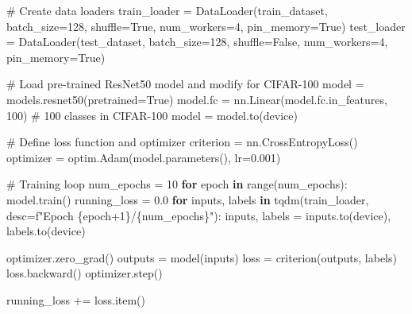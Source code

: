 \documentclass[
  letterpaper,
  DIV=11,
  numbers=noendperiod]{scrreprt}
\newenvironment{Shaded}{\begin{snugshade}}{\end{snugshade}}
\newcommand{\BuiltInTok}[1]{\textcolor[rgb]{0.00,0.23,0.31}{#1}}
\newcommand{\CommentTok}[1]{\textcolor[rgb]{0.37,0.37,0.37}{#1}}
\newcommand{\ControlFlowTok}[1]{\textcolor[rgb]{0.00,0.23,0.31}{\textbf{#1}}}
\newcommand{\DecValTok}[1]{\textcolor[rgb]{0.68,0.00,0.00}{#1}}
\newcommand{\FloatTok}[1]{\textcolor[rgb]{0.68,0.00,0.00}{#1}}
\newcommand{\KeywordTok}[1]{\textcolor[rgb]{0.00,0.23,0.31}{\textbf{#1}}}
\newcommand{\NormalTok}[1]{\textcolor[rgb]{0.00,0.23,0.31}{#1}}
\newcommand{\OperatorTok}[1]{\textcolor[rgb]{0.37,0.37,0.37}{#1}}
\newcommand{\SpecialCharTok}[1]{\textcolor[rgb]{0.37,0.37,0.37}{#1}}
\newcommand{\SpecialStringTok}[1]{\textcolor[rgb]{0.13,0.47,0.30}{#1}}
\newcommand{\VariableTok}[1]{\textcolor[rgb]{0.07,0.07,0.07}{#1}}
\begin{document}
\begin{Shaded}
\begin{Highlighting}[]
\CommentTok{\# Create data loaders}
\NormalTok{train\_loader }\OperatorTok{=}\NormalTok{ DataLoader(train\_dataset, batch\_size}\OperatorTok{=}\DecValTok{128}\NormalTok{, shuffle}\OperatorTok{=}\VariableTok{True}\NormalTok{, num\_workers}\OperatorTok{=}\DecValTok{4}\NormalTok{, pin\_memory}\OperatorTok{=}\VariableTok{True}\NormalTok{)}
\NormalTok{test\_loader }\OperatorTok{=}\NormalTok{ DataLoader(test\_dataset, batch\_size}\OperatorTok{=}\DecValTok{128}\NormalTok{, shuffle}\OperatorTok{=}\VariableTok{False}\NormalTok{, num\_workers}\OperatorTok{=}\DecValTok{4}\NormalTok{, pin\_memory}\OperatorTok{=}\VariableTok{True}\NormalTok{)}

\CommentTok{\# Load pre{-}trained ResNet50 model and modify for CIFAR{-}100}
\NormalTok{model }\OperatorTok{=}\NormalTok{ models.resnet50(pretrained}\OperatorTok{=}\VariableTok{True}\NormalTok{)}
\NormalTok{model.fc }\OperatorTok{=}\NormalTok{ nn.Linear(model.fc.in\_features, }\DecValTok{100}\NormalTok{)  }\CommentTok{\# 100 classes in CIFAR{-}100}
\NormalTok{model }\OperatorTok{=}\NormalTok{ model.to(device)}

\CommentTok{\# Define loss function and optimizer}
\NormalTok{criterion }\OperatorTok{=}\NormalTok{ nn.CrossEntropyLoss()}
\NormalTok{optimizer }\OperatorTok{=}\NormalTok{ optim.Adam(model.parameters(), lr}\OperatorTok{=}\FloatTok{0.001}\NormalTok{)}

\CommentTok{\# Training loop}
\NormalTok{num\_epochs }\OperatorTok{=} \DecValTok{10}
\ControlFlowTok{for}\NormalTok{ epoch }\KeywordTok{in} \BuiltInTok{range}\NormalTok{(num\_epochs):}
\NormalTok{    model.train()}
\NormalTok{    running\_loss }\OperatorTok{=} \FloatTok{0.0}
    \ControlFlowTok{for}\NormalTok{ inputs, labels }\KeywordTok{in}\NormalTok{ tqdm(train\_loader, desc}\OperatorTok{=}\SpecialStringTok{f"Epoch }\SpecialCharTok{\{}\NormalTok{epoch}\OperatorTok{+}\DecValTok{1}\SpecialCharTok{\}}\SpecialStringTok{/}\SpecialCharTok{\{}\NormalTok{num\_epochs}\SpecialCharTok{\}}\SpecialStringTok{"}\NormalTok{):}
\NormalTok{        inputs, labels }\OperatorTok{=}\NormalTok{ inputs.to(device), labels.to(device)}

\NormalTok{        optimizer.zero\_grad()}
\NormalTok{        outputs }\OperatorTok{=}\NormalTok{ model(inputs)}
\NormalTok{        loss }\OperatorTok{=}\NormalTok{ criterion(outputs, labels)}
\NormalTok{        loss.backward()}
\NormalTok{        optimizer.step()}

\NormalTok{        running\_loss }\OperatorTok{+=}\NormalTok{ loss.item()}


\end{Highlighting}
\end{Shaded}
\end{document}
